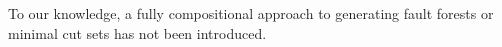 To our knowledge, a fully compositional approach to generating fault forests or minimal cut sets has not been introduced.




















